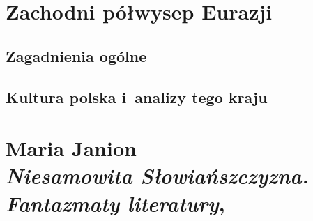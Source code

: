 \documentclass[a4paper,11pt]{article}
\numberwithin{equation}{section}
\begin{document}










\newpage

\section{Zachodni półwysep Eurazji}

\VerSpaceTwo



\subsection{Zagadnienia ogólne}

\VerSpaceThree










\subsection{Kultura polska i~analizy tego kraju}

\VerSpaceThree



\section{ %
  Maria Janion \\
  \textit{Niesamowita Słowiańszczyzna. Fantazmaty literatury},
  \cite{JanionNiesamowitaSlowianszczyzna2006} }


\end{document}
